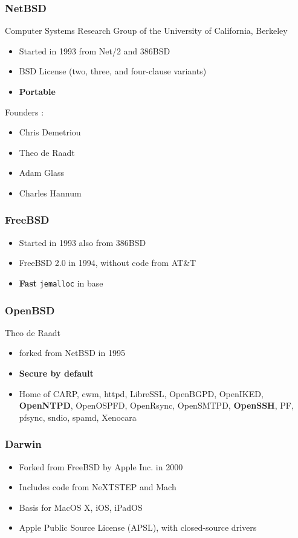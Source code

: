 \documentclass[8pt]{beamer}
\begin{document}
\begin{frame}
  \frametitle{NetBSD}
  Computer Systems Research Group of the University of California, Berkeley
  \begin{itemize}
  \item Started in 1993 from Net/2 and 386BSD
  \item BSD License (two, three, and four-clause variants)
  \item {\bf Portable}
  \end{itemize}
  \vspace{1em}
  Founders :
  \begin{itemize}
  \item Chris Demetriou
  \item Theo de Raadt
  \item Adam Glass
  \item Charles Hannum
  \end{itemize}
\end{frame}

\begin{frame}
  \frametitle{FreeBSD}
  \begin{itemize}
  \item Started in 1993 also from 386BSD
  \item FreeBSD 2.0 in 1994, without code from AT\&T
  \item {\bf Fast} {\tt jemalloc} in base
  \end{itemize}
\end{frame}

\begin{frame}
  \frametitle{OpenBSD}
  Theo de Raadt
  \begin{itemize}
  \item forked from NetBSD in 1995
  \item {\bf Secure by default}
  \item Home of CARP, cwm, httpd, LibreSSL, OpenBGPD, OpenIKED, {\bf OpenNTPD}, OpenOSPFD, OpenRsync, OpenSMTPD, {\bf OpenSSH}, PF, pfsync, sndio, spamd, Xenocara
  \end{itemize}
\end{frame}

\begin{frame}
  \frametitle{Darwin}
  \begin{itemize}
  \item Forked from FreeBSD by Apple Inc. in 2000
  \item Includes code from NeXTSTEP and Mach
  \item Basis for MacOS X, iOS, iPadOS
  \item Apple Public Source License (APSL), with closed-source drivers
  \end{itemize}
\end{frame}
\end{document}
